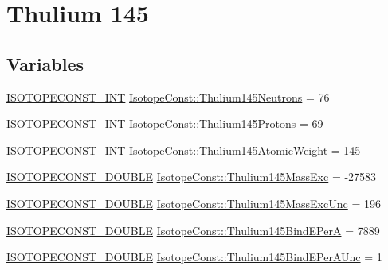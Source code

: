 \hypertarget{group___isotope_const-_thulium-_tm145}{}\section{Thulium 145}
\label{group___isotope_const-_thulium-_tm145}
\subsection*{Variables}
\begin{DoxyCompactItemize}
\item 
\mbox{\hyperlink{group___isotope_const-_macros_ga5f18360b3e99483a35c32d789e62621c}{I\+S\+O\+T\+O\+P\+E\+C\+O\+N\+S\+T\+\_\+\+I\+NT}} \mbox{\hyperlink{group___isotope_const-_thulium-_tm145_ga652357673dfba717d0e02316a585dedf}{Isotope\+Const\+::\+Thulium145\+Neutrons}} = 76
\item 
\mbox{\hyperlink{group___isotope_const-_macros_ga5f18360b3e99483a35c32d789e62621c}{I\+S\+O\+T\+O\+P\+E\+C\+O\+N\+S\+T\+\_\+\+I\+NT}} \mbox{\hyperlink{group___isotope_const-_thulium-_tm145_gaaaad96c0278f42d0c8fc892ff82e9c99}{Isotope\+Const\+::\+Thulium145\+Protons}} = 69
\item 
\mbox{\hyperlink{group___isotope_const-_macros_ga5f18360b3e99483a35c32d789e62621c}{I\+S\+O\+T\+O\+P\+E\+C\+O\+N\+S\+T\+\_\+\+I\+NT}} \mbox{\hyperlink{group___isotope_const-_thulium-_tm145_gae9b4a7458f68633b43484ac135bfb1b3}{Isotope\+Const\+::\+Thulium145\+Atomic\+Weight}} = 145
\item 
\mbox{\hyperlink{group___isotope_const-_macros_ga8f45a7272ce02c0b4c65c44636ed719a}{I\+S\+O\+T\+O\+P\+E\+C\+O\+N\+S\+T\+\_\+\+D\+O\+U\+B\+LE}} \mbox{\hyperlink{group___isotope_const-_thulium-_tm145_gacb991bb8387f230144bf6b84ce92b4cf}{Isotope\+Const\+::\+Thulium145\+Mass\+Exc}} = -\/27583
\item 
\mbox{\hyperlink{group___isotope_const-_macros_ga8f45a7272ce02c0b4c65c44636ed719a}{I\+S\+O\+T\+O\+P\+E\+C\+O\+N\+S\+T\+\_\+\+D\+O\+U\+B\+LE}} \mbox{\hyperlink{group___isotope_const-_thulium-_tm145_gad4a2377c43d3e2cc2a08d524f3d98e11}{Isotope\+Const\+::\+Thulium145\+Mass\+Exc\+Unc}} = 196
\item 
\mbox{\hyperlink{group___isotope_const-_macros_ga8f45a7272ce02c0b4c65c44636ed719a}{I\+S\+O\+T\+O\+P\+E\+C\+O\+N\+S\+T\+\_\+\+D\+O\+U\+B\+LE}} \mbox{\hyperlink{group___isotope_const-_thulium-_tm145_gafa8dbf147125434fe838982b157e60a6}{Isotope\+Const\+::\+Thulium145\+Bind\+E\+PerA}} = 7889
\item 
\mbox{\hyperlink{group___isotope_const-_macros_ga8f45a7272ce02c0b4c65c44636ed719a}{I\+S\+O\+T\+O\+P\+E\+C\+O\+N\+S\+T\+\_\+\+D\+O\+U\+B\+LE}} \mbox{\hyperlink{group___isotope_const-_thulium-_tm145_ga837e03fdd65b4518e9c3f89348697210}{Isotope\+Const\+::\+Thulium145\+Bind\+E\+Per\+A\+Unc}} = 1

\end{DoxyCompactItemize}
